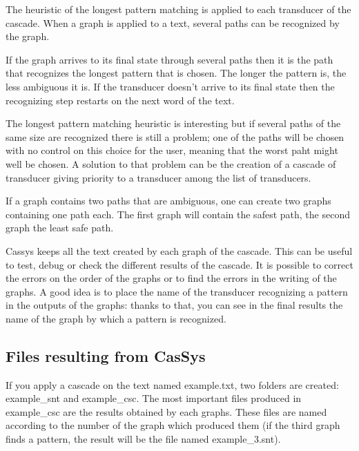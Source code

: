 The heuristic of the longest pattern matching is applied to each transducer of the cascade. When a graph is applied to a text, several paths can be recognized
by the graph. 

\bigskip
\noindent If the graph arrives to its final state through several paths then it is the path that recognizes the longest pattern that is chosen. The longer
the pattern is, the less ambiguous it is.
If the transducer doesn't arrive to its final state then the recognizing step restarts on the next word of the text.

\bigskip
\noindent The longest pattern matching heuristic is interesting but if several paths of the same size are recognized there is still a problem; one of the paths will be chosen with no control on this choice for the user, meaning that the worst paht might well be chosen. A solution to that problem can be the creation of a cascade of transducer giving priority to a transducer among the list of transducers.

\bigskip
\noindent If a graph contains two paths that are ambiguous, one can create two graphs containing one path each. 
The first graph will contain the safest path, the second graph the least safe path.

\bigskip
\noindent Cassys keeps all the text created by each graph of the cascade. This can be useful to test, debug or check the different results of the cascade. It is possible 
to correct the errors on the order of the graphs or to find the errors in the writing of the graphs. A good idea is to place the name of the transducer recognizing a pattern in the outputs of the graphs: thanks to that, you can see in the final results the name of the graph by which a pattern is recognized. 

\subsection{Files resulting from CasSys}

If you apply a cascade on the text named example.txt, two folders are created: example\_snt and example\_csc.
The most important files produced in example\_csc are the results obtained by each graphs. These files are named according to the number of the graph which produced them (if the third graph finds a pattern, the result will be the file named example\_3.snt).
